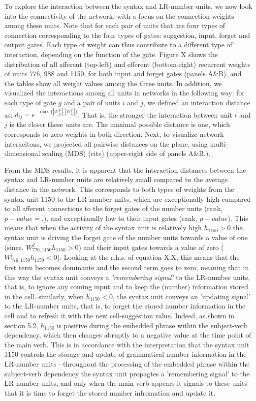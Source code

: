 To explore the interaction between the syntax and LR-number units, we now look into the connectivity of the network, with a focus on the connection weights among these units. Note that for each pair of units that are four types of connection corresponding to the four types of gates: suggestion, input, forget and output gates. Each type of weight can thus contribute to a different type of interaction, depending on the function of the gate. Figure X shows the distribution of all afferent (top-left) and efferent (bottom-right) recurrent weights of units 776, 988 and 1150, for both input and forget gates (panels A\&B), and the tables show all weight values among the three units. In addition, we visualized the interactions among all units in networks in the following way: for each type of gate $g$ and a pair of units $i$ and $j$, we defined an interaction distance as: $d_{ij}=e^{-\max{\{|W_{ji}^{g}|, |W_{ij}^{g}|\}}}$. That is, the stronger the interaction between unit $i$ and $j$ is the closer these units are. The maximal possible distance is one, which corresponds to zero weights in both direction. Next, to visualize network interacitons, we projected all pairwise distances on the plane, using multi-dimensional scaling (MDS) (cite) (upper-right side of panels A\&B.).

From the MDS results, it is apparent that the interaction distances between the syntax and LR-number units are relatively small compared to the average distance in the network. This corresponds to both types of weights from the syntax unit 1150 to the LR-number units, which are exceptionally high compared to all afferent connections to the forget gates of the number units (rank, $p-value=$,), and exceptiaonlly low to their input gates (rank, $p-value$). This means that when the activity of the syntax unit is relatively high $h_1150 > 0$ the syntax unit is driving the forget gate of the number units towards a value of one (since, $W^f_{776, 1150}h_1150>0$) and their input gates towards a value of zero ($W^i_{776, 1150}h_1150<0$). Looking at the r.h.s. of equation X.X, this means that the first term becomes dominante and the second term goes to zero, meaning that in this way the syntax unit conveys a \textit{'remembering signal'} to the LR-number units, that is, to ignore any coming input and to keep the (number) information stored in the cell. similarly, when $h_1150<0$, the syntax unit conveys an 'updating signal' to the LR-number units, that is, to forget the stored number information in the cell and to refresh it with the new cell-suggestion value. Indeed, as shown in section 5.2, $h_1150$ is positive during the embedded phrase within the subject-verb dependency, which then changes abruptly to a negative value at the time point of the main verb. This is in accordance with the interpretation that the syntax unit 1150 controls the storage and update of grammatical-number information in the LR-number units - throughout the processing of the embedded phrase within the subject-verb dependency the syntax unit propagtes a 'remembering signal' to the LR-number units, and only when the main verb appears it signals to these units that it is time to forget the stored number infromation and update it. 

